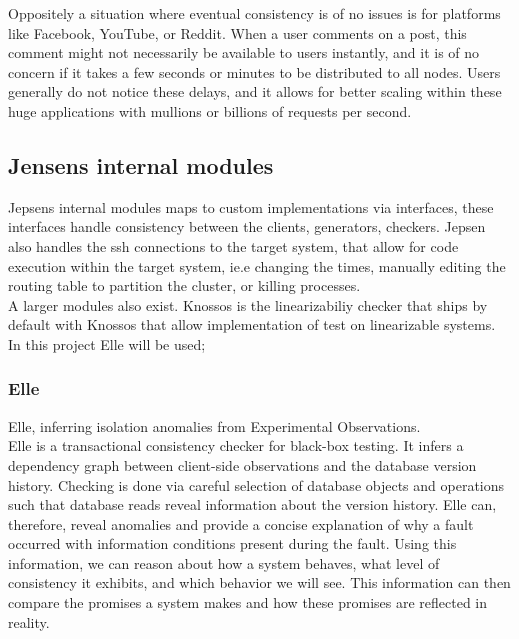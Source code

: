 \documentclass[a4paper,10pt,titlepage]{report}
\begin{document}
Oppositely a situation where eventual consistency is of no issues is for platforms like Facebook, YouTube, or Reddit. When a user comments on a post, this comment might not necessarily be available to users instantly, and it is of no concern if it takes a few seconds or minutes to be distributed to all nodes. Users generally do not notice these delays, and it allows for better scaling within these huge applications with mullions or billions of requests per second.



\subsection{Jensens internal modules}
Jepsens internal modules maps to custom implementations via interfaces, these interfaces handle consistency between the clients, generators, checkers. Jepsen also handles the ssh connections to the target system, that allow for code execution within the target system, ie.e changing the times, manually editing the routing table to partition the cluster, or killing processes.\\

A larger modules also exist. Knossos\cite{Knossos} is the linearizabiliy checker that ships by default with Knossos that allow implementation of test on linearizable systems. In this project Elle will be used;

\subsubsection{Elle}
Elle,\cite{elle} inferring isolation anomalies from Experimental Observations. \\

Elle is a transactional consistency checker for black-box testing. It infers a dependency graph between client-side observations and the database version history. Checking is done via careful selection of database objects and operations such that database reads reveal information about the version history. Elle can, therefore, reveal anomalies and provide a concise explanation of why a fault occurred with information conditions present during the fault. Using this information, we can reason about how a system behaves, what level of consistency it exhibits, and which behavior we will see. This information can then compare the promises a system makes and how these promises are reflected in reality.\\
\vspace{5mm}
\end{document}

